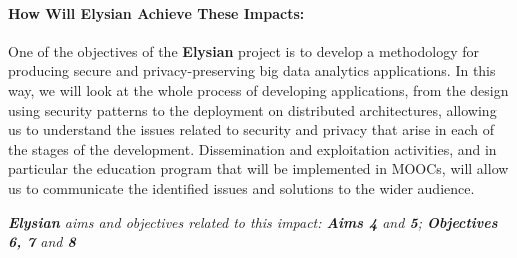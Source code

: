 \documentclass[a4paper,11pt]{article}
\newcommand{\project}[1]{\textbf{#1}\xspace}
\newcommand{\SECURITY}{\project{Elysian}}
\newcommand{\TheProject}{\SECURITY}
\begin{document}
\begin{mdframed}[backgroundcolor=gray!10]
\paragraph{How Will \TheProject{} Achieve These Impacts:}
One of the objectives of the \TheProject{} project is to develop a methodology for producing secure and privacy-preserving big data analytics applications. In this way, we will look at the whole process of developing applications, from the design using security patterns to the deployment on distributed architectures, allowing us to understand the issues related to security and privacy that arise in each of the stages of the development. Dissemination and exploitation activities, and in particular the education program that will be implemented in MOOCs, will allow us to communicate the identified issues and solutions to the wider audience.

\emph{\TheProject{} aims and objectives related to this impact: \textbf{Aims 4 } and \textbf{5}; \textbf{Objectives 6, 7} and \textbf{8}}
\end{mdframed}




\end{document}
